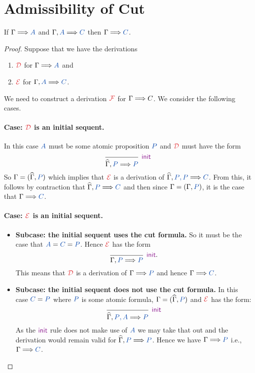 \section{Admissibility of Cut}

\begin{theorem}[Cut]
  If $\sequent{A}$ and $\sequent[A]{C}$ then $\sequent{C}$.
\end{theorem}
\begin{proof}
  Suppose that we have the derivations
  \begin{enumerate}
    \item $\drv{D}$ for $\sequent{A}$ and
    \item $\drv{E}$ for $\sequent[A]{C}$.
  \end{enumerate}
  We need to construct a derivation $\drv{F}$ for $\sequent{}{C}$.
  We consider the following cases.

  \paragraph{Case: $\drv{D}$ is an initial sequent.} In this case
  $\prp{A}$ must be some atomic proposition $\prp{P}$ and $\drv{D}$
  must have the form
  \[
      \begin{prooftree}
        \infer0[$\initRule$]{\sequentHat[P]{P}}
      \end{prooftree}
  \]
  So $\Gamma = (\widehat{\Gamma}, \prp{P})$ which implies that $\drv{E}$ is a
  derivation of $\sequentHat[\prp{P}, \prp{P}]{C}$. From this, it follows by
  contraction that $\sequentHat[\prp{P}]{C}$ and then since $\Gamma = (\Gamma,
  \prp{P})$, it is the case that $\sequent{\prp{C}}$.

  \paragraph{Case: $\drv{E}$ is an initial sequent.}

  \begin{itemize}
    \item \textbf{Subcase: the initial sequent uses the cut formula.} So it
    must be the case that $\prp{A} = \prp{C} = \prp{P}$. Hence $\drv{E}$ has
    the form
    \[
      \begin{prooftree}
        \infer0[$\initRule$.]{\sequent[P]{P}}
      \end{prooftree}
    \]
    This means that $\drv{D}$ is a derivation of $\sequent{P}$ and hence
    $\sequent{C}$.

    \item \textbf{Subcase: the initial sequent does not use the cut formula.}
    In this case $\prp{C} = \prp{P}$ where $\prp{P}$ is some atomic formula,
    $\Gamma = (\widehat{\Gamma}, \prp{P})$ and $\drv{E}$ has the form:
    \[
      \begin{prooftree}
        \infer0[$\initRule$]{\sequentHat[\prp{P}, \prp{A}]{\prp{P}}}
      \end{prooftree}
    \]
    As the $\initRule$ rule does not make use of $\prp{A}$ we may take that out
    and the derivation would remain valid for $\sequentHat[\prp{P}]{\prp{P}}$.
    Hence we have $\sequent{\prp{P}}$ i.e., $\sequent{\prp{C}}$.
  \end{itemize}


\end{proof}
